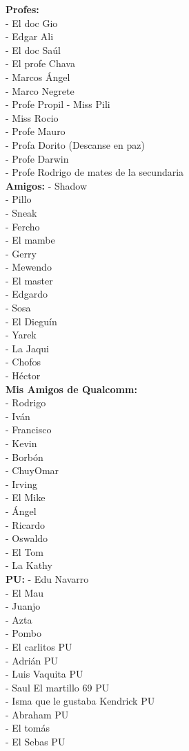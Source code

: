 \textbf{Profes:}\\
- El doc Gio\\
- Edgar Ali\\
- El doc Saúl\\
- El profe Chava\\
- Marcos Ángel\\
- Marco Negrete\\
- Profe Propil
- Miss Pili\\
- Miss Rocio\\
- Profe Mauro\\
- Profa Dorito (Descanse en paz)\\
- Profe Darwin\\
- Profe Rodrigo de mates de la secundaria\\

\textbf{Amigos:}
- Shadow\\
- Pillo\\
- Sneak\\
- Fercho\\
- El mambe\\
- Gerry\\
- Mewendo\\
- El master\\
- Edgardo\\
- Sosa\\
- El Dieguín\\
- Yarek\\
- La Jaqui\\
- Chofos\\
- Héctor\\

\textbf{Mis Amigos de Qualcomm:}\\
- Rodrigo\\
- Iván\\
- Francisco\\
- Kevin\\
- Borbón\\
- ChuyOmar\\
- Irving\\
- El Mike\\
- Ángel\\
- Ricardo\\
- Oswaldo\\
- El Tom\\
- La Kathy\\

\textbf{PU:}
- Edu Navarro\\
- El Mau\\
- Juanjo\\
- Azta\\
- Pombo\\
- El carlitos PU\\
- Adrián PU\\
- Luis Vaquita PU\\
- Saul El martillo 69 PU\\
- Isma que le gustaba Kendrick PU\\
- Abraham PU\\
- El tomás\\
- El Sebas PU\\

